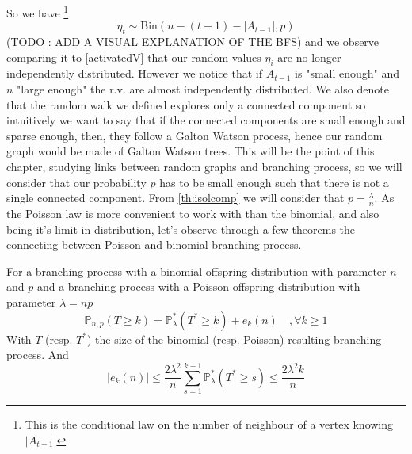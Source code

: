 So we have
\footnote{This is the conditional law on the number of neighbour of a vertex knowing $|A_{t-1}|$}
\begin{equation}
	\eta_t \sim \text{Bin}( n - (t-1) - |A_{t-1}|, p)
\end{equation}
(TODO : ADD A VISUAL EXPLANATION OF THE BFS)
and we observe comparing it to \ref{activatedV} that our random values $\eta_i$ are no longer independently distributed. 
However we notice that if $A_{t-1}$ is "small enough" and $n$ "large enough" the r.v. are almost independently distributed.
We also denote that the random walk we defined explores only a connected component so intuitively we want to say that if the connected components are small enough and sparse enough, then, they follow a Galton Watson process, hence our random graph would be made of Galton Watson trees.
This will be the point of this chapter, studying links between random graphs and branching process, so we will consider that our probability $p$ has to be small enough such that there is not a single connected component. From \ref{th:isolcomp} we will consider that $p=\frac{\lambda}{n}$.
\newline
As the Poisson law is more convenient to work with than the binomial, and also being it's limit in distribution, let's observe through a few theorems the connecting between Poisson and binomial branching process.
\begin{theorem}\label{th:poibin}
For a branching process with a binomial offspring distribution with parameter $n$ and $p$ and a branching process with a Poisson offspring distribution with parameter $\lambda = np$
	\begin{equation}
		\mathbb{P}_{n,p}(T \geq k) = \mathbb{P}_{\lambda}^*(T^* \geq k) + e_k(n)\quad, \forall k \geq 1
	\end{equation}
	With $T$ (resp. $T^*$) the size of the binomial (resp. Poisson) resulting branching process.
	And 
	\begin{equation}
		|e_k(n)| \leq \frac{2\lambda ^2}{n}\sum_{s=1}^{k-1} \mathbb{P}_{\lambda}^*(T^* \geq s) \leq \frac{2\lambda ^2k}{n}
	\end{equation}
\end{theorem}

